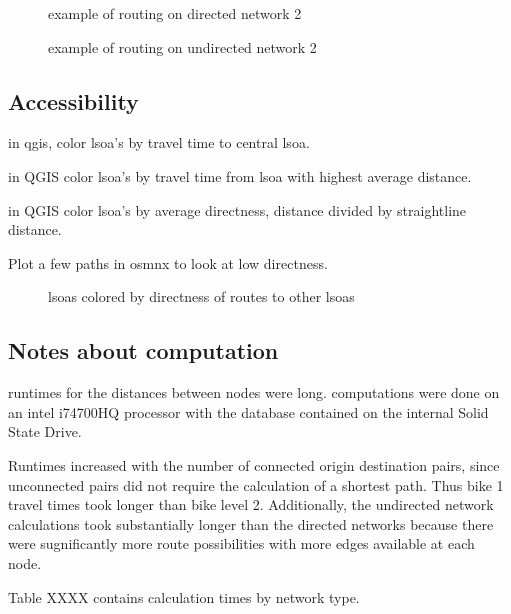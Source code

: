 \begin{figure}
\centering
\caption{example of routing on directed network 2}
\label{fig:routing_1}
\end{figure}

\begin{figure}
\centering
\caption{example of routing on undirected network 2}
\label{fig:routing_1}
\end{figure}


\subsection{Accessibility}

in qgis, color lsoa's by travel time to central lsoa. 

in QGIS color lsoa's by travel time from lsoa with highest average distance. 

in QGIS color lsoa's by  average directness, distance divided by straightline distance. 

Plot a few paths in osmnx to look at low directness. 


\begin{figure}
\centering
\caption{lsoas colored by directness of routes to other lsoas}
\label{fig:lsoa_directness}
\end{figure}



\subsection{Notes about computation}

runtimes for the distances between nodes were long. computations were done on an intel i74700HQ processor with the database contained on the internal Solid State Drive. 

Runtimes increased with the number of connected origin destination pairs, since unconnected pairs  did not require the calculation of a shortest path. Thus bike 1 travel times took longer than bike level 2. Additionally, the undirected network calculations took substantially longer than the directed networks because there were sugnificantly more route possibilities with more edges available at each node. 

Table XXXX contains calculation times by network type. 




